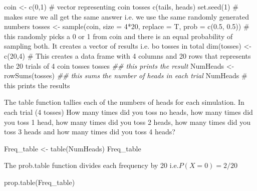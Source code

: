 \documentclass[
  10pt,
  letterpaper,
  DIV=11,
  numbers=noendperiod]{scrartcl}
\newenvironment{Shaded}{\begin{snugshade}}{\end{snugshade}}
\newcommand{\AttributeTok}[1]{\textcolor[rgb]{0.40,0.45,0.13}{#1}}
\newcommand{\CommentTok}[1]{\textcolor[rgb]{0.37,0.37,0.37}{#1}}
\newcommand{\DecValTok}[1]{\textcolor[rgb]{0.68,0.00,0.00}{#1}}
\newcommand{\DocumentationTok}[1]{\textcolor[rgb]{0.37,0.37,0.37}{\textit{#1}}}
\newcommand{\FloatTok}[1]{\textcolor[rgb]{0.68,0.00,0.00}{#1}}
\newcommand{\FunctionTok}[1]{\textcolor[rgb]{0.28,0.35,0.67}{#1}}
\newcommand{\NormalTok}[1]{\textcolor[rgb]{0.00,0.23,0.31}{#1}}
\newcommand{\OtherTok}[1]{\textcolor[rgb]{0.00,0.23,0.31}{#1}}
\newcommand{\SpecialCharTok}[1]{\textcolor[rgb]{0.37,0.37,0.37}{#1}}
\begin{document}
\begin{Shaded}
\begin{Highlighting}[]
\NormalTok{coin }\OtherTok{\textless{}{-}} \FunctionTok{c}\NormalTok{(}\DecValTok{0}\NormalTok{,}\DecValTok{1}\NormalTok{) }\CommentTok{\# vector representing coin tosses c(tails, heads)}
\FunctionTok{set.seed}\NormalTok{(}\DecValTok{1}\NormalTok{) }\CommentTok{\# makes sure we all get the same answer i.e. we use the same randomly generated numbers}
\NormalTok{tosses }\OtherTok{\textless{}{-}} \FunctionTok{sample}\NormalTok{(coin, }\AttributeTok{size =} \DecValTok{4}\SpecialCharTok{*}\DecValTok{20}\NormalTok{, }\AttributeTok{replace =}\NormalTok{ T, }\AttributeTok{prob =} \FunctionTok{c}\NormalTok{(}\FloatTok{0.5}\NormalTok{, }\FloatTok{0.5}\NormalTok{)) }\CommentTok{\# this randomly picks a 0 or 1 from coin and there is an equal probability of sampling both. It creates a vector of results i.e. bo tosses in total}
\FunctionTok{dim}\NormalTok{(tosses) }\OtherTok{\textless{}{-}} \FunctionTok{c}\NormalTok{(}\DecValTok{20}\NormalTok{,}\DecValTok{4}\NormalTok{) }\CommentTok{\# This creates a data frame with 4 columns and 20 rows that represents the 20 trials of 4 coin tosses}
\NormalTok{tosses }\DocumentationTok{\#\# this prints the result}
\NormalTok{NumHeads }\OtherTok{\textless{}{-}} \FunctionTok{rowSums}\NormalTok{(tosses) }\DocumentationTok{\#\# this sums the number of heads in each trial}
\NormalTok{NumHeads }\CommentTok{\# this prints the results  }
\end{Highlighting}
\end{Shaded}

The table function tallies each of the numbers of heads for each
simulation. In each trial (4 tosses) How many times did you toss no
heads, how many times did you toss 1 head, how many times did you toss 2
heads, how many times did you toss 3 heads and how many times did you
toss 4 heads?

\begin{Shaded}
\begin{Highlighting}[]
\NormalTok{Freq\_table }\OtherTok{\textless{}{-}} \FunctionTok{table}\NormalTok{(NumHeads)}
\NormalTok{Freq\_table}
\end{Highlighting}
\end{Shaded}

The prob.table function divides each frequency by 20 i.e.\(P(X=0)=2/20\)

\begin{Shaded}
\begin{Highlighting}[]
\FunctionTok{prop.table}\NormalTok{(Freq\_table) }
\end{Highlighting}
\end{Shaded}
\end{document}
